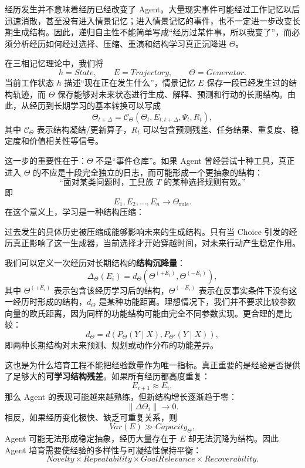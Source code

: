 经历发生并不意味着经历已经改变了 Agent。大量现实事件可能经过工作记忆以后迅速消散，甚至没有进入情景记忆；进入情景记忆的事件，也不一定进一步改变长期生成结构。因此，递归自主性不能简单写成“经历过某件事，所以我变了”，而必须分析经历如何经过选择、压缩、重演和结构学习真正沉降进 $\Theta$。

在三相记忆理论中，我们将
\[
h=State,\qquad
E=Trajectory,\qquad
\Theta=Generator.
\]
当前工作状态 $h$ 描述“现在正在发生什么”，情景记忆 $E$ 保存一段已经发生过的结构轨迹，而 $\Theta$ 保存能够对未来状态进行生成、解释、预测和行动的长期结构。由此，从经历到长期学习的基本转换可以写成
\[
\Theta_{t+\Delta}
=
\mathcal C_\Theta
\left(
\Theta_t,
E_{t:t+\Delta},
\Psi_t,
R_t
\right),
\]
其中 $\mathcal C_\Theta$ 表示结构凝结/更新算子，$R_t$ 可以包含预测残差、任务结果、重复度、稳定度和价值相关性等信号。

这一步的重要性在于：$\Theta$ 不是“事件仓库”。如果 Agent 曾经尝试十种工具，真正进入 $\Theta$ 的不应是十段完全独立的日志，而可能形成一个更抽象的结构：
\[
\text{``面对某类问题时，工具族 }T
\text{ 的某种选择规则有效。''}
\]
即
\[
E_1,E_2,\ldots,E_n
\longrightarrow
\Theta_{\mathrm{rule}}.
\]
在这个意义上，学习是一种结构压缩：
\begin{statementbox}
\centering
{}
\end{statementbox}
过去发生的具体历史被压缩成能够影响未来的生成结构。只有当 Choice 引发的经历真正影响了这一生成器，当前选择才开始穿越时间，对未来行动产生稳定作用。

我们可以定义一次经历对长期结构的\textbf{结构沉降量}：
\[
\Delta_\Theta(E_i)
=
d_\Theta
\left(
\Theta^{(+E_i)},
\Theta^{(-E_i)}
\right),
\]
其中 $\Theta^{(+E_i)}$ 表示包含该经历学习后的结构，$\Theta^{(-E_i)}$ 表示在反事实条件下没有这一经历时形成的结构，$d_\Theta$ 是某种功能距离。理想情况下，我们并不要求比较参数向量的欧氏距离，因为同样的功能结构可能由完全不同参数实现。更合理的是比较：
\[
d_\Theta
=
d
\left(
P_\Theta(Y\mid X),
P_{\Theta'}(Y\mid X)
\right),
\]
即两种长期结构对未来预测、规划或动作分布的功能差异。

这也是为什么培育工程不能把经验数量作为唯一指标。真正重要的是经验是否提供了足够大的\textbf{可学习结构残差}。如果所有经历都高度重复：
\[
E_{i+1}\approx E_i,
\]
那么 Agent 的表现可能越来越熟练，但新结构增长逐渐趋于零：
\[
\|\Delta\Theta_i\|\rightarrow 0.
\]
相反，如果经历变化极快、缺乏可重复关系，则
\[
Var(E)\gg Capacity_\Theta,
\]
Agent 可能无法形成稳定抽象，经历大量存在于 $E$ 却无法沉降为结构。因此 Agent 培育需要使经验的多样性与可凝结性保持平衡：
\[
Novelty
\times
Repeatability
\times
GoalRelevance
\times
Recoverability.
\]

